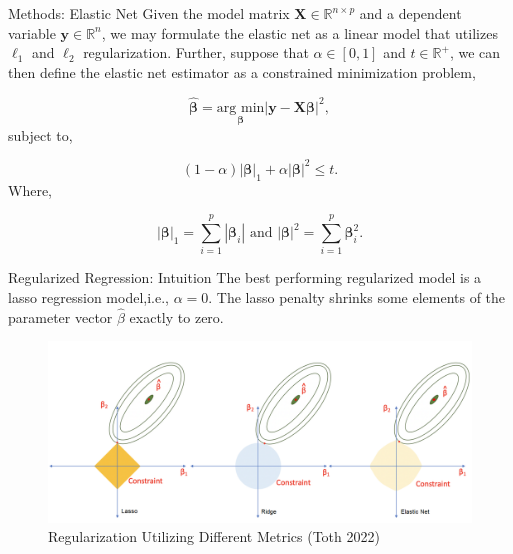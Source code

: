 \documentclass[
  11pt,
  ignorenonframetext,
]{beamer}
\begin{document}
\begin{frame}{Methods: Elastic Net}
\protect\hypertarget{methods-elastic-net}{}
Given the model matrix \(\mathbf{X} \in \mathbb{R}^{n\times p}\) and a
dependent variable \(\mathbf{y} \in \mathbb{R}^n\), we may formulate the
elastic net as a linear model that utilizes \(\ell_1\) and \(\ell_2\)
regularization. Further, suppose that \(\alpha \in [0, 1]\) and
\(t \in \mathbb{R}^+\), we can then define the elastic net estimator as
a constrained minimization problem,

\[ 
\boldsymbol{\hat{\beta}} = \underset{\boldsymbol{\beta}}{\text{arg min}} |\mathbf{y} - \mathbf{X}\boldsymbol{\beta}|^2,
\] subject to,

\[
(1 - \alpha)|\boldsymbol{\beta}|_1 + \alpha|\boldsymbol{\beta}|^2 \leq t. 
\] Where,

\[
|\boldsymbol{\beta}|_1 = \sum\limits_{i = 1}^{p}|\boldsymbol{\beta}_i|\text{ and } |\boldsymbol{\beta}|^2 = \sum\limits_{i = 1}^{p}\boldsymbol{\beta}_i^2.
\]
\end{frame}

\begin{frame}{Regularized Regression: Intuition}
\protect\hypertarget{regularized-regression-intuition}{}
The best performing regularized model is a lasso regression model,i.e.,
\(\alpha = 0\). The lasso penalty shrinks some elements of the parameter
vector \(\hat\beta\) exactly to zero.

\begin{figure}

{\centering \includegraphics[width=0.9\linewidth]{./../figures/lasso_ridge} 

}

\caption{Regularization Utilizing Different Metrics (Toth 2022)}\label{fig:unnamed-chunk-3}
\end{figure}
\end{frame}
\end{document}
